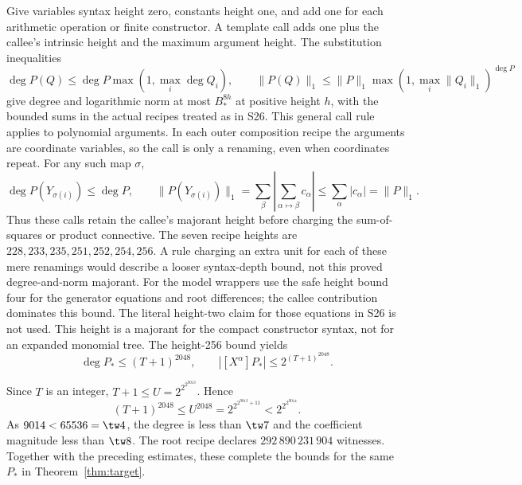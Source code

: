 Give variables syntax height zero, constants height one, and add one
for each arithmetic operation or finite constructor. A template call
adds one plus the callee's intrinsic height and the maximum argument
height. The substitution inequalities
\[
 \deg P(Q)\le\deg P\max(1,\max_i\deg Q_i),\qquad
 \|P(Q)\|_1\le\|P\|_1\max(1,\max_i\|Q_i\|_1)^{\deg P}
\]
give degree and logarithmic norm at most $B_*^{8h}$ at positive height
$h$, with the bounded sums in the actual recipes treated as in S26.
This general call rule applies to polynomial arguments. In each outer
composition recipe the arguments are coordinate variables, so the call
is only a renaming, even when coordinates repeat. For any such map
$\sigma$,
\[
 \deg P(Y_{\sigma(i)})\le\deg P,\qquad
 \|P(Y_{\sigma(i)})\|_1
 =\sum_\beta\left|\sum_{\alpha\mapsto\beta}c_\alpha\right|
 \le\sum_\alpha|c_\alpha|=\|P\|_1.
\]
Thus these calls retain the callee's majorant height before charging
the sum-of-squares or product connective. The seven recipe heights are
$228,233,235,251,252,254,256$. A rule charging an extra unit for each
of these mere renamings would describe a looser syntax-depth bound,
not this proved degree-and-norm majorant.
For the model wrappers use the safe height bound four for the
generator equations and root differences; the callee contribution
dominates this bound. The literal height-two claim for those equations
in S26 is not used.
This height is a majorant for the compact constructor syntax, not for
an expanded monomial tree. The height-256 bound yields
\[
 \deg P_*\le(T+1)^{2048},\qquad
 |[X^\alpha]P_*|\le2^{(T+1)^{2048}}.
\]

Since $T$ is an integer, $T+1\le U=2^{2^{2^{9013}}}$. Hence
\[
 (T+1)^{2048}\le U^{2048}=2^{2^{2^{9013}+11}}
                     <2^{2^{2^{9014}}}.
\]
As $9014<65536=\tw4$, the degree is less than $\tw7$ and the
coefficient magnitude less than $\tw8$. The root recipe declares
$292\,890\,231\,904$ witnesses. Together with the preceding estimates,
these complete the bounds for the same $P_*$ in
Theorem~\ref{thm:target}.

